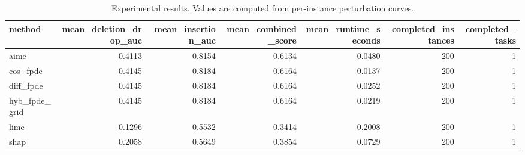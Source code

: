 \begin{table}[t]
\caption{Experimental results. Values are computed from per-instance perturbation curves.}
\label{tab:main_results_computed}
\centering
\begin{tabular}{lrrrrrr}
\toprule
method & mean\_deletion\_drop\_auc & mean\_insertion\_auc & mean\_combined\_score & mean\_runtime\_seconds & completed\_instances & completed\_tasks \\
\midrule
aime & 0.4113 & 0.8154 & 0.6134 & 0.0480 & 200 & 1 \\
cos\_fpde & 0.4145 & 0.8184 & 0.6164 & 0.0137 & 200 & 1 \\
diff\_fpde & 0.4145 & 0.8184 & 0.6164 & 0.0252 & 200 & 1 \\
hyb\_fpde\_grid & 0.4145 & 0.8184 & 0.6164 & 0.0219 & 200 & 1 \\
lime & 0.1296 & 0.5532 & 0.3414 & 0.2008 & 200 & 1 \\
shap & 0.2058 & 0.5649 & 0.3854 & 0.0729 & 200 & 1 \\
\bottomrule
\end{tabular}

\end{table}
